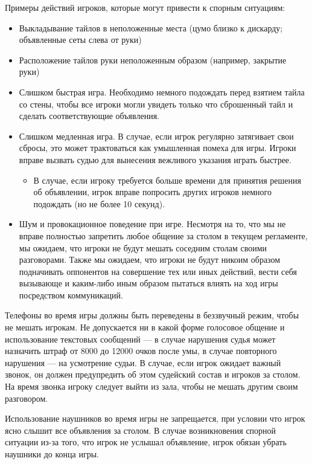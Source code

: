 Примеры действий игроков, которые могут привести к спорным ситуациям:
\begin{itemize}
	\item Выкладывание тайлов в неположенные места (цумо близко к дискарду; объявленные сеты слева от руки)
	\item Расположение тайлов руки неположенным образом (например, закрытие руки)
	\item Слишком быстрая игра. Необходимо немного подождать перед взятием тайла со стены, чтобы все игроки могли увидеть только что сброшенный тайл и сделать соответствующие объявления.
	\item Слишком медленная игра. В случае, если игрок регулярно затягивает свои сбросы, это может трактоваться как умышленная помеха для игры. Игроки вправе вызвать судью для вынесения вежливого указания играть быстрее.
	\begin{itemize}
		\item В случае, если игроку требуется больше времени для принятия решения об объявлении, игрок вправе попросить других игроков немного подождать (но не более 10 секунд).
	\end{itemize}
	\item Шум и провокационное поведение при игре. Несмотря на то, что мы не вправе полностью запретить любое общение за столом в текущем регламенте, мы ожидаем, что игроки не будут мешать соседним столам своими разговорами. Также мы ожидаем, что игроки не будут никоим образом подначивать оппонентов на совершение тех или иных действий, вести себя вызывающе и каким-либо иным образом пытаться влиять на ход игры посредством коммуникаций.
\end{itemize}

Телефоны во время игры должны быть переведены в беззвучный режим, чтобы не мешать игрокам. Не допускается ни в какой форме голосовое общение и использование текстовых сообщений --- в случае нарушения судья может назначить штраф от 8000 до 12000 очков после умы, в случае повторного нарушения --- на усмотрение судьи. В случае, если игрок ожидает важный звонок, он должен предупредить об этом судейский состав и игроков за столом. На время звонка игроку следует выйти из зала, чтобы не мешать другим своим разговором.

Использование наушников во время игры не запрещается, при условии что игрок ясно слышит все объявления за столом. В случае возникновения спорной ситуации из-за того, что игрок не услышал объявление, игрок обязан убрать наушники до конца игры.

